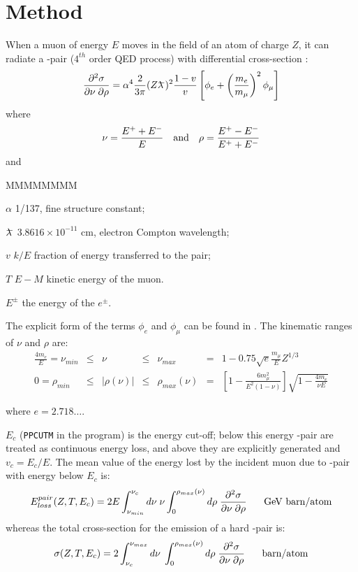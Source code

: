 \section{Method}
When a muon of energy $E$ moves in the field of
an atom of charge $Z$, it can radiate a \Pep\Pem-pair
($4^{th}$ order QED process) with 
differential cross-section \cite{bib-LOHM}:
\begin{equation}
\frac{\partial^2 \sigma}{\partial \nu \; \partial \rho}=
\alpha^4 \frac {2}{3 \pi}   (Z \lambdar)^2 \frac{1-v}{v}
\left [ \phi_e + \left(\frac{m_{e}} {m_{\mu}}\right)^2 \phi_{\mu} \right ]
\end{equation}
where
\[
\nu = \frac{ E^+ + E^-}{E} \mbox{\quad and\quad}\rho =
\frac{E^+ - E^-}{E^+ + E^-}
\]
and
\begin{DLtt}{MMMMMMMM}
\item[$\alpha$]   1/137, fine structure constant;
\item[$\lambdar$] $3.8616 \times 10^{-11}$ cm, electron Compton wavelength;
\item[$v$]        $k/E$ fraction of energy transferred to the pair;
\item[$T$]        $E-M$ kinetic energy of the muon.
\item[$E^{\pm}$]  the energy of the $e^{\pm}$.
\end{DLtt}

The explicit form of the terms $\phi_e$ and $\phi_{\mu}$
can be found in \cite{bib-LOHM}. The kinematic ranges of $\nu$ and $\rho $ are:
\begin{equation}
\begin{array}{RCCCCCL}
\frac{4m_{e}}{E}=\nu_{min} & \leq & \nu & \leq  & \nu_{max} & = &
1 -0.75 \sqrt{e}\frac{m_{\mu}}{E} Z^{1/3}       \\ [0.7cm]
0=\rho_{min} & \leq & |\rho (\nu) | & \leq & \rho_{max} (\nu) &
= & \left [1-\frac{6m_{\mu}^2}{E^2 (1-\nu)}\right]
         \sqrt{1- \frac{4m_{e}}{\nu E}} 
\end{array}
\end{equation}
 
where   $e = 2.718\dots$.
 
$E_c$ ({\tt PPCUTM} in the program) is the energy cut-off; below this 
energy \Pep\Pem-pair are treated as continuous energy loss,
and above they are explicitly
generated and $v_c = E_c/E$.
The mean value of the energy lost by the incident muon due to
\Pep\Pem-pair with energy below $E_{c}$ is:
\begin{equation}
\label{eq:phys450-1}
 E_{loss}^{pair}(Z,T,E_c ) =
 2E \int_{\nu_{min}}^{\nu_c}{ d\nu\;\nu \int_{0}^{\rho_{max}(\nu)}{
 d\rho \;
\frac{\partial^2 \sigma}{\partial\nu \; \partial\rho}}}
\mbox{\hspace{0.5cm} GeV barn/atom}
\end{equation}
whereas the total cross-section for the emission of a hard \Pep\Pem-pair is:
\begin{equation}
\label{eq:phys450-2}
\sigma (Z,T,E_c) =
 2 \int_{\nu_c}^{\nu_{max}} d \nu\;
   \int_{0}^{\rho_{max}(\nu)}
 d \rho  \; \frac{\partial^2\sigma}{ \partial\nu \; \partial\rho}
\mbox{\hspace{0.5cm} barn/atom}
\end{equation}

